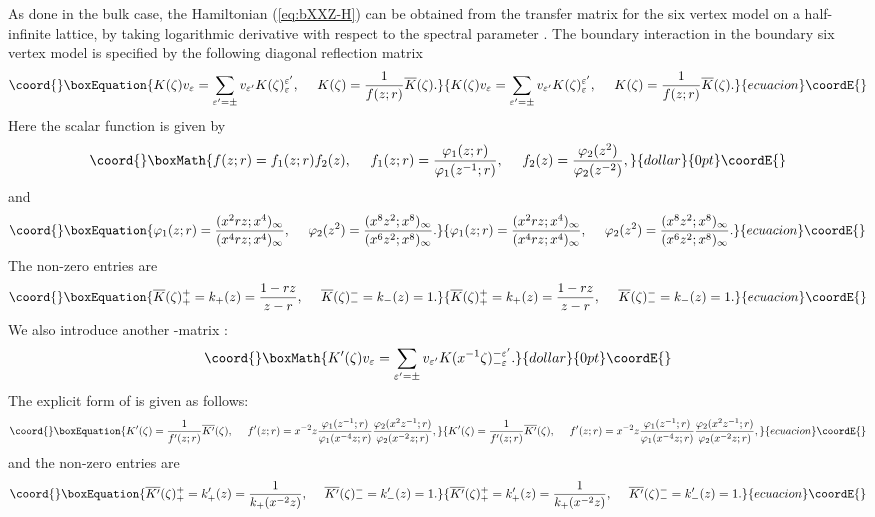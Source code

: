\documentclass[a4paper,10pt]{article}
\begin{document}
{As done in 
the bulk case, the Hamiltonian (\ref{eq:bXXZ-H}) 
can be obtained from the transfer matrix for the 
six vertex model on a half-infinite lattice, by taking 
logarithmic derivative with respect to the spectral 
parameter \myHighlight{$\zeta$}\coordHE{}. The boundary interaction in the 
boundary six vertex model is specified by the following 
diagonal reflection matrix \cite{RE,Skl}
\begin{equation}\coord{}\boxEquation{
K(\zeta )v_\varepsilon =\sum_{\varepsilon'=\pm} 
v_{\varepsilon'} K(\zeta )^{\varepsilon'}_\varepsilon , 
~~~~
K(\zeta )=\frac{1}{f(z;r)}\overline{K}(\zeta ). 
\label{eq:K-mat}
}{
K(\zeta )v_\varepsilon =\sum_{\varepsilon'=\pm} 
v_{\varepsilon'} K(\zeta )^{\varepsilon'}_\varepsilon , 
~~~~
K(\zeta )=\frac{1}{f(z;r)}\overline{K}(\zeta ). 
}{ecuacion}\coordE{}\end{equation}
Here the scalar function \coordHE{} is given by 
$$\coord{}\boxMath{
f(z;r)=f_1 (z;r)f_2 (z), ~~~~
f_1 (z;r)=\frac{\varphi_1 (z; r)}{\varphi_1 (z^{-1}; r)}, 
~~~~ f_2 (z)=\frac{\varphi_2 (z^2 )}{\varphi_2 (z^{-2})}, 
}{dollar}{0pt}\coordE{}$$
and 
\begin{equation}\coord{}\boxEquation{
\varphi_1 (z; r)=\frac{(x^2 rz;x^4)_{\infty}}
{(x^4 rz;x^4)_{\infty}}, ~~~~
\varphi_2 (z^2 )=\frac{(x^8 z^{2};x^8)_{\infty}}
{(x^6 z^2 ;x^8)_{\infty}}. 
\label{eq:varphi}
}{
\varphi_1 (z; r)=\frac{(x^2 rz;x^4)_{\infty}}
{(x^4 rz;x^4)_{\infty}}, ~~~~
\varphi_2 (z^2 )=\frac{(x^8 z^{2};x^8)_{\infty}}
{(x^6 z^2 ;x^8)_{\infty}}. 
}{ecuacion}\coordE{}\end{equation}
The non-zero entries are 
\begin{equation}\coord{}\boxEquation{
\overline{K}(\zeta )^+_+ =k_+ (z)=
\frac{1-rz}{z-r}, ~~~~
\overline{K}(\zeta )^-_- =k_- (z)=1. 
\label{eq:K-comp}
}{
\overline{K}(\zeta )^+_+ =k_+ (z)=
\frac{1-rz}{z-r}, ~~~~
\overline{K}(\zeta )^-_- =k_- (z)=1. 
}{ecuacion}\coordE{}\end{equation}
We also introduce another \coordHE{}-matrix \coordHE{}: 
$$\coord{}\boxMath{
K' (\zeta )v_\varepsilon =
\sum_{\varepsilon'=\pm} v_{\varepsilon'} 
K(x^{-1}\zeta )^{-\varepsilon'}_{-\varepsilon}. 
}{dollar}{0pt}\coordE{}$$
The explicit form of \coordHE{} is given as 
follows: 
\begin{equation}\coord{}\boxEquation{
K' (\zeta )=\frac{1}{f'(z;r)}\overline{K'}(\zeta ), 
~~~~
f'(z;r)=x^{-2}z
\frac{\varphi_1 (z^{-1}; r)}{\varphi_1 (x^{-4}z; r)}
\frac{\varphi_2 (x^2 z^{-1}; r)}{\varphi_2 (x^{-2}z; r)}, 
\label{eq:K*-mat}
}{
K' (\zeta )=\frac{1}{f'(z;r)}\overline{K'}(\zeta ), 
~~~~
f'(z;r)=x^{-2}z
\frac{\varphi_1 (z^{-1}; r)}{\varphi_1 (x^{-4}z; r)}
\frac{\varphi_2 (x^2 z^{-1}; r)}{\varphi_2 (x^{-2}z; r)}, 
}{ecuacion}\coordE{}\end{equation}
and the non-zero entries are 
\begin{equation}\coord{}\boxEquation{
\overline{K'}(\zeta )^+_+ =k'_+ (z)=
\frac{1}{k_+ (x^{-2}z)}, ~~~~
\overline{K'}(\zeta )^-_- =k'_- (z)=1. 
\label{eq:K*-comp}
}{
\overline{K'}(\zeta )^+_+ =k'_+ (z)=
\frac{1}{k_+ (x^{-2}z)}, ~~~~
\overline{K'}(\zeta )^-_- =k'_- (z)=1. 
}{ecuacion}\coordE{}\end{equation}

}
\end{document}
